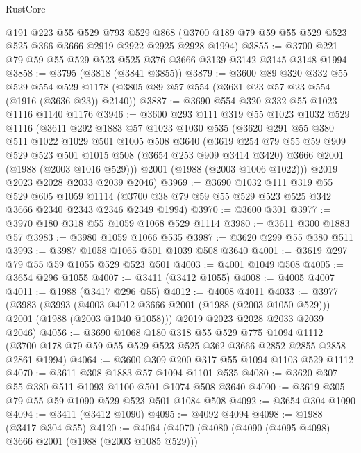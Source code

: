 \begin{lexlean}{RustCore}
\begin{coremodule}
    @191
    @223
    @55
    @529
    @793
    @529
    @868
    (@3700 @189 @79 @59 @55 @529 @523 @525 @366 @3666 @2919 @2922 @2925 @2928 @1994)
@3855 := @3700 @221 @79 @59 @55 @529 @523 @525 @376 @3666 @3139 @3142 @3145 @3148 @1994
@3858 := @3795 (@3818 (@3841 @3855))
@3879 := @3600
    @89
    @320
    @332
    @55
    @529
    @554
    @529
    @1178
    (@3805 @89 @57 @554 (@3631 @23 @57 @23 @554 (@1916 (@3636 @23)) @2140))
@3887 := @3690 @554 @320 @332 @55 @1023 @1116 @1140 @1176
@3946 := @3600
    @293
    @111
    @319
    @55
    @1023
    @1032
    @529
    @1116
    (@3611
      @292
      @1883
      @57
      @1023
      @1030
      @535
      (@3620
        @291
        @55
        @380
        @511
        @1022
        @1029
        @501
        @1005
        @508
        @3640
        (@3619
          @254
          @79
          @55
          @59
          @909
          @529
          @523
          @501
          @1015
          @508
          (@3654 @253 @909 @3414 @3420)
          @3666
          @2001
          (@1988 (@2003 @1016 @529)))
        @2001
        (@1988 (@2003 @1006 @1022)))
      @2019
      @2023
      @2028
      @2033
      @2039
      @2046)
@3969 := @3690
    @1032
    @111
    @319
    @55
    @529
    @605
    @1059
    @1114
    (@3700 @38 @79 @59 @55 @529 @523 @525 @342 @3666 @2340 @2343 @2346 @2349 @1994)
@3970 := @3600 @301
@3977 := @3970 @180 @318 @55 @1059 @1068 @529 @1114
@3980 := @3611 @300 @1883 @57
@3983 := @3980 @1059 @1066 @535
@3987 := @3620 @299 @55 @380 @511
@3993 := @3987 @1058 @1065 @501 @1039 @508 @3640
@4001 := @3619 @297 @79 @55 @59 @1055 @529 @523 @501
@4003 := @4001 @1049 @508
@4005 := @3654 @296 @1055
@4007 := @3411 (@3412 @1055)
@4008 := @4005 @4007
@4011 := @1988 (@3417 @296 @55)
@4012 := @4008 @4011
@4033 := @3977
    (@3983
      (@3993 (@4003 @4012 @3666 @2001 (@1988 (@2003 @1050 @529))) @2001 (@1988 (@2003 @1040 @1058)))
      @2019
      @2023
      @2028
      @2033
      @2039
      @2046)
@4056 := @3690
    @1068
    @180
    @318
    @55
    @529
    @775
    @1094
    @1112
    (@3700 @178 @79 @59 @55 @529 @523 @525 @362 @3666 @2852 @2855 @2858 @2861 @1994)
@4064 := @3600 @309 @200 @317 @55 @1094 @1103 @529 @1112
@4070 := @3611 @308 @1883 @57 @1094 @1101 @535
@4080 := @3620 @307 @55 @380 @511 @1093 @1100 @501 @1074 @508 @3640
@4090 := @3619 @305 @79 @55 @59 @1090 @529 @523 @501 @1084 @508
@4092 := @3654 @304 @1090
@4094 := @3411 (@3412 @1090)
@4095 := @4092 @4094
@4098 := @1988 (@3417 @304 @55)
@4120 := @4064
    (@4070
      (@4080
        (@4090 (@4095 @4098) @3666 @2001 (@1988 (@2003 @1085 @529)))

\end{coremodule}
\end{lexlean}
